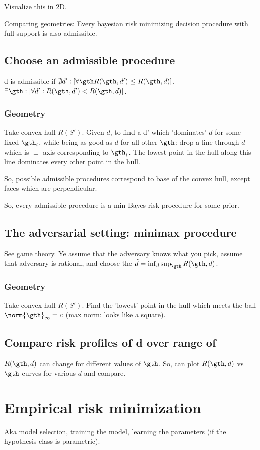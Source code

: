 \documentclass[oneside, article]{memoir}
\begin{document}
Visualize this in 2D.

Comparing geometries: Every bayesian risk minimizing decision procedure with full support is also admissible.

\subsection{Choose an admissible procedure}
d is admissible if $\nexists d': [\forall \gth R(\gth, d') \leq R(\gth, d)]$, $\exists \gth: [\forall d': R(\gth, d') < R(\gth, d)]$.

\subsubsection{Geometry}
Take convex hull $R(S')$. Given $d$, to find a d' which 'dominates' $d$ for some fixed $\gth_i$, while being as good as $d$ for all other $\gth$: drop a line through $d$ which is $\perp$ axis corresponding to $\gth_i$. The lowest point in the hull along this line dominates every other point in the hull.

So, possible admissible procedures correspond to base of the convex hull, except faces which are perpendicular.

So, every admissible procedure is a min Bayes risk procedure for some prior.

\subsection{The adversarial setting: minimax procedure}
See game theory. Ye assume that the adversary knows what you pick, assume that adversary is rational, and choose the $\hat{d} = \inf_d \sup_{\gth} R(\gth, d)$.

\subsubsection{Geometry}
Take convex hull $R(S')$. Find the 'lowest' point in the hull which meets the ball $\norm{\gth}_\infty = c$ (max norm: looks like a square).

\subsection{Compare risk profiles of d over range of }
$R(\gth, d)$ can change for different values of $\gth$. So, can plot $R(\gth, d)$ vs $\gth$ curves for various $d$ and compare.

\section{Empirical risk minimization}
Aka model selection, training the model, learning the parameters (if the hypothesis class is parametric).
\end{document}
